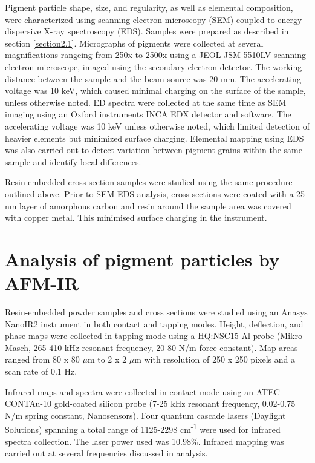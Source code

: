 Pigment particle shape, size, and regularity, as well as elemental composition, were characterized using scanning electron microscopy (SEM) coupled to energy dispersive X-ray spectroscopy (EDS). Samples were prepared as described in section \ref{section2.1}. Micrographs of pigments were collected at several magnifications rangeing from 250x to 2500x using a JEOL JSM-5510LV scanning electron microscope, imaged using the secondary electron detector. The working distance between the sample and the beam source was 20 mm. The accelerating voltage was 10 keV, which caused minimal charging on the surface of the sample, unless otherwise noted. ED spectra were collected at the same time as SEM imaging using an Oxford instruments INCA EDX detector and software. The accelerating voltage was 10 keV unless otherwise noted, which limited detection of heavier elements but minimized surface charging. Elemental mapping using EDS was also carried out to detect variation between pigment grains within the same sample and identify local differences.

Resin embedded cross section samples were studied using the same procedure outlined above. Prior to SEM-EDS analysis, cross sections were coated with a 25 nm layer of amorphous carbon and resin around the sample area was covered with copper metal. This minimised surface charging in the instrument.

\section[Analysis of pigment particles by AFM-IR]{Analysis of pigment particles by AFM-IR}
\label{section2.4}

Resin-embedded powder samples and cross sections were studied using an Anasys NanoIR2 instrument in both contact and tapping modes. Height, deflection, and phase maps were collected in tapping mode using a HQ:NSC15 Al probe (Mikro Masch, 265-410 kHz resonant frequency, 20-80 N/m force constant). Map areas ranged from 80 x 80 $\mu$m to 2 x 2 $\mu$m with resolution of 250 x 250 pixels and a scan rate of 0.1 Hz. 

Infrared maps and spectra were collected in contact mode using an ATEC-CONTAu-10 gold-coated silicon probe (7-25 kHz resonant frequency, 0.02-0.75 N/m spring constant, Nanosensors). Four quantum cascade lasers (Daylight Solutions) spanning a total range of 1125-2298 cm\textsuperscript{-1} were used for infrared spectra collection. The laser power used was 10.98\%. Infrared mapping was carried out at several frequencies discussed in analysis.


